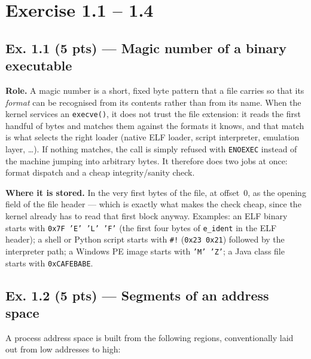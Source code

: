 \section*{Exercise 1.1 -- 1.4}
\label{p1:sec:main}

\subsection*{Ex. 1.1 (5 pts) --- Magic number of a binary executable}
\label{p1:sec:magic}

\textbf{Role.} A magic number is a short, fixed byte pattern that a file carries so
that its \emph{format} can be recognised from its contents rather than from its name.
When the kernel services an \texttt{execve()}, it does not trust the file extension: it
reads the first handful of bytes and matches them against the formats it knows, and that
match is what selects the right loader (native ELF loader, script interpreter, emulation
layer, \dots). If nothing matches, the call is simply refused with \texttt{ENOEXEC}
instead of the machine jumping into arbitrary bytes. It therefore does two jobs at once:
format dispatch and a cheap integrity/sanity check.

\textbf{Where it is stored.} In the very first bytes of the file, at offset~0, as the
opening field of the file header --- which is exactly what makes the check cheap, since
the kernel already has to read that first block anyway. Examples: an ELF binary starts
with \texttt{0x7F 'E' 'L' 'F'} (the first four bytes of \texttt{e\_ident} in the ELF
header); a shell or Python script starts with \texttt{\#!} (\texttt{0x23 0x21}) followed
by the interpreter path; a Windows PE image starts with \texttt{'M' 'Z'}; a Java class
file starts with \texttt{0xCAFEBABE}.

\subsection*{Ex. 1.2 (5 pts) --- Segments of an address space}
\label{p1:sec:segments}

A process address space is built from the following regions, conventionally laid out from
low addresses to high:

